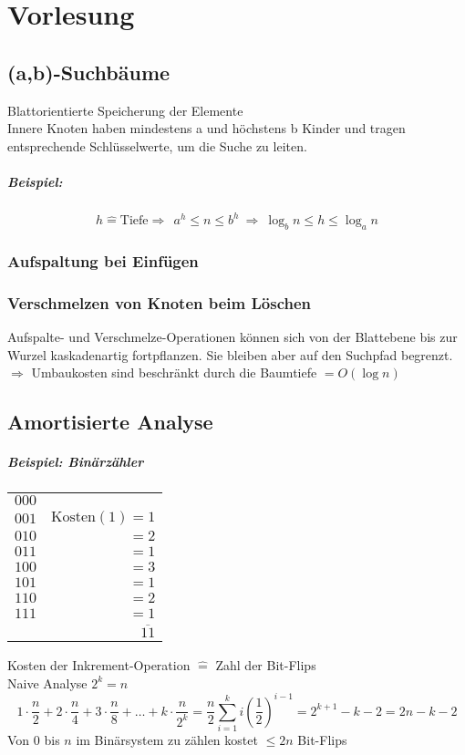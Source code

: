 \chapter{Vorlesung}
\section{(a,b)-Suchbäume}
Blattorientierte Speicherung der Elemente\\
Innere Knoten haben mindestens a und höchstens b Kinder und tragen entsprechende Schlüsselwerte, um die Suche zu leiten.
\paragraph{Beispiel:}%
\[h\hat{=}\text{Tiefe}\Rightarrow ~~ a^h\leq n \leq b^h ~\Rightarrow ~ \log_b n \leq h \leq \log_a n\]
\subsection{Aufspaltung bei Einfügen}
\subsection{Verschmelzen von Knoten beim Löschen}
Aufspalte- und Verschmelze-Operationen können sich von der Blattebene bis zur Wurzel kaskadenartig fortpflanzen. Sie bleiben aber auf den Suchpfad begrenzt.\\
$\Rightarrow$ Umbaukosten sind beschränkt durch die Baumtiefe $=O(\log n)$
\section{Amortisierte Analyse}
\paragraph{Beispiel: Binärzähler}
	\begin{tabular}{lr}
		$000$& \\
		$001$&$\text{Kosten}(1)=1$\\
		$010$&$=2$\\
		$011$&$=1$\\
		$100$&$=3$\\
		$101$&$=1$\\
		$110$&$=2$\\
		$111$&$=1$\\
		 &$\overline{11}$
	\end{tabular}
	Kosten der Inkrement-Operation $\hat{=}$ Zahl der Bit-Flips\\
	Naive Analyse $2^k=n$
	\[1\cdot\frac{n}{2}+2\cdot\frac{n}{4}+3\cdot\frac{n}{8}+\ldots+k\cdot\frac{n}{2^k}=\frac{n}{2}\sum_{i=1}^{k}i(\frac{1}{2})^{i-1}=2^{k+1}-k-2=2n-k-2 \]
Von $0$ bis $n$ im Binärsystem zu zählen kostet  $\leq 2n$ Bit-Flips

